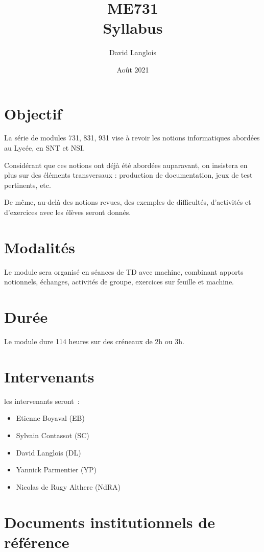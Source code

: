 \documentclass[french]{article}
\title{ME731\\Syllabus}
\author{David Langlois}
\date{Août 2021}
\begin{document}
\maketitle

\section{Objectif}

La série de modules 731, 831, 931 vise à revoir les notions informatiques abordées au Lycée, en SNT et NSI.

Considérant que ces notions ont déjà été abordées auparavant, on insistera en plus sur des éléments transversaux : production de documentation, jeux de test pertinents, etc.

De même, au-delà des notions revues, des exemples de difficultés, d'activités et d'exercices avec les élèves seront donnés.

\section{Modalités}

Le module sera organisé en séances de TD avec machine, combinant apports notionnels, échanges, activités de groupe, exercices sur feuille et machine.

\section{Durée}

Le module dure 114 heures sur des créneaux de 2h ou 3h.

\section{Intervenants}

les intervenants seront~:

\begin{itemize}
    \item Etienne Boyaval (EB)
    \item Sylvain Contassot (SC)
    \item David Langlois (DL)
    \item Yannick Parmentier (YP)
    \item Nicolas de Rugy Althere (NdRA)
\end{itemize}



\section{Documents institutionnels de référence}
\end{document}
